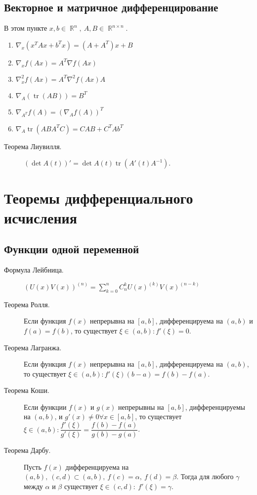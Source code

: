 \documentclass[a4paper,12pt]{scrartcl}
\DeclareMathOperator{\bbr}{\mathbb{R}}
\DeclareMathOperator{\tr}{tr}
\begin{document}
\subsection{Векторное и матричное дифференцирование}
\begin{multicols}{2}
В этом пункте $x,b\in\bbr^n,\ A,B\in\bbr^{n\times n}$.
\begin{enumerate}
\item $\nabla_x(x^TAx + b^Tx) = (A+A^T)x+B$ 
\item $\nabla_xf(Ax) = A^T\nabla f(Ax)$
\item $\nabla_x^2f(Ax) = A^T\nabla^2 f(Ax)A$
\item $\nabla_A(\tr(AB)) = B^T$
\item $\nabla_{A^T}f(A) = (\nabla_A f(A))^T$
\item $\nabla_A\tr(ABA^TC) = CAB+C^TAb^T$
\end{enumerate}
\end{multicols}
\begin{description}
 \item[Теорема Лиувилля.] $(\det A(t))' = \det A(t)\tr \left( A'(t)A^{-1}\right)$.
\end{description}

\section{Теоремы дифференциального исчисления}
\subsection{Функции одной переменной}
\begin{description}
\item[Формула Лейбница.] $(U(x)V(x))^{(n)} = \sum\limits_{k=0}^{n}C_{n}^{k}U(x)^{(k)}V(x)^{(n-k)}$
\item[Теорема Ролля.] Если функция $f(x)$ непрерывна на $[a,b]$, дифференцируема на $(a,b)$ и $f(a) = f(b)$, то существует $\xi\in (a,b): f'(\xi) =0$.
\item[Теорема Лагранжа.] Если функция $f(x)$ непрерывна на $[a,b]$, дифференцируема на $(a,b)$, то существует $\xi\in (a,b): f'(\xi)(b-a) = f(b) - f(a)$.
\item[Теорема Коши.]Если функции $f(x)$ и $g(x)$ непрерывны на $[a,b]$, дифференцируемы на $(a,b)$, и $g'(x) \neq 0 \forall x\in[a,b]$, то существует $\xi\in (a,b): \dfrac{f'(\xi)}{g'(\xi)}= \dfrac{f(b) - f(a)}{g(b)-g(a)}$.
\item[Теорема Дарбу.] Пусть $f(x)$ дифференцируема на $(a,b),\ (c,d)\subset(a,b),\ f(c)=\alpha,\ f(d)=\beta$. Тогда для любого $\gamma$ между $\alpha$ и $\beta$ существует $\xi\in(c,d):\ f'(\xi) = \gamma$.
\end{description}
\end{document}
